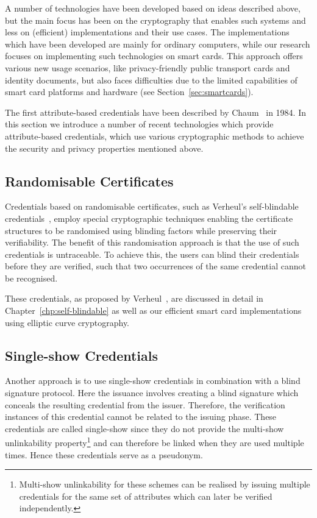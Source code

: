 A number of technologies have been developed based on ideas described above, but
the main focus has been on the cryptography that enables such systems and less
on (efficient) implementations and their use cases. The implementations which
have been developed are mainly for ordinary computers, while our research
focuses on implementing such technologies on smart cards. This approach offers
various new usage scenarios, like privacy-friendly public transport cards and
identity documents, but also faces difficulties due to the limited capabilities
of smart card platforms and hardware (see Section~\ref{sec:smartcards}).

The first attribute-based credentials have been described by
Chaum~\cite{Chaum1985} in 1984. In this section we introduce a number of recent
technologies which provide attribute-based credentials, which use various
cryptographic methods to achieve the security and privacy properties mentioned
above.

\subsection{Randomisable Certificates}

Credentials based on randomisable certificates, such as Verheul's self-blindable
credentials~\cite{Verheul01}, employ special cryptographic techniques enabling
the certificate structures to be randomised using blinding factors while
preserving their verifiability. The benefit of this randomisation approach is
that the use of such credentials is untraceable. To achieve this, the users can
blind their credentials before they are verified, such that two occurrences of
the same credential cannot be recognised.

These credentials, as proposed by Verheul~\cite{Verheul01}, are discussed in
detail in Chapter~\ref{chp:self-blindable} as well as our efficient smart card
implementations~\cite{BatinaHJMV10,HoepmanJV10} using elliptic curve
cryptography.

\subsection{Single-show Credentials}

Another approach is to use single-show credentials in combination with a
blind signature protocol. Here the issuance involves creating a blind signature
which conceals the resulting credential from the issuer. Therefore, the
verification instances of this credential cannot be related to the issuing
phase. These credentials are called single-show since they do not provide the
multi-show unlinkability property\footnote{Multi-show unlinkability for these
schemes can be realised by issuing multiple credentials for the same set of
attributes which can later be verified independently.} and can therefore be
linked when they are used multiple times. Hence these credentials serve as a
pseudonym.

